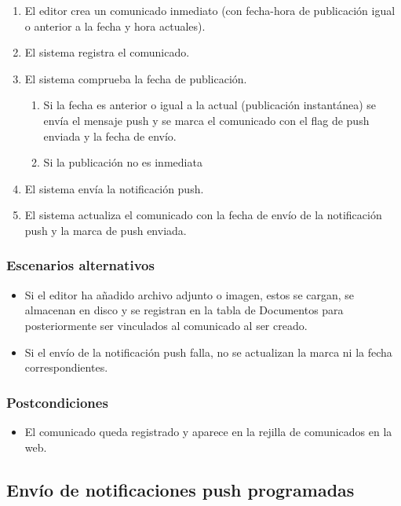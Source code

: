 \begin{enumerate}
    \item El editor crea un comunicado inmediato (con fecha-hora de publicación igual o anterior a la fecha y hora actuales).
    \item El sistema registra el comunicado.
    \item El sistema comprueba la fecha de publicación.
    \begin{enumerate}
        \item Si la fecha es anterior o igual a la actual (publicación instantánea) se envía el mensaje push y se marca el comunicado con el flag de push enviada y la fecha de envío.
        \item Si la publicación no es inmediata
    \end{enumerate}
    \item El sistema envía la notificación push.
    \item El sistema actualiza el comunicado con la fecha de envío de la notificación push y la marca de push enviada.
\end{enumerate}

\subsubsection*{Escenarios alternativos}
\begin{itemize}
    \item Si el editor ha añadido archivo adjunto o imagen, estos se cargan, se almacenan en disco y se registran en la tabla de Documentos para posteriormente ser vinculados al comunicado al ser creado.
    \item Si el envío de la notificación push falla, no se actualizan la marca ni la fecha correspondientes.
\end{itemize}

\subsubsection*{Postcondiciones}
\begin{itemize}
    \item El comunicado queda registrado y aparece en la rejilla de comunicados en la web.
\end{itemize}


\subsection{Envío de notificaciones push programadas}

